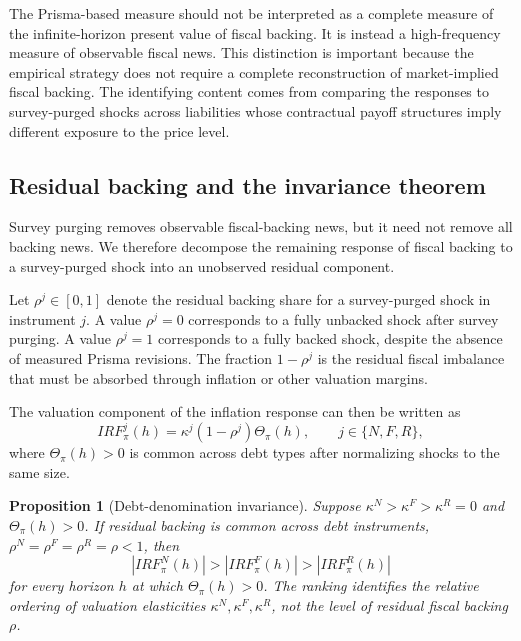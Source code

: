 \documentclass[12pt,a4paper]{article}
\newtheorem{proposition}{Proposition}
\begin{document}
The Prisma-based measure should not be interpreted as a complete measure of the infinite-horizon present value of fiscal backing. It is instead a high-frequency measure of observable fiscal news. This distinction is important because the empirical strategy does not require a complete reconstruction of market-implied fiscal backing. The identifying content comes from comparing the responses to survey-purged shocks across liabilities whose contractual payoff structures imply different exposure to the price level.

\subsection{Residual backing and the invariance theorem}

Survey purging removes observable fiscal-backing news, but it need not remove all backing news. We therefore decompose the remaining response of fiscal backing to a survey-purged shock into an unobserved residual component.

Let \(\rho^j\in[0,1]\) denote the residual backing share for a survey-purged shock in instrument \(j\). A value \(\rho^j=0\) corresponds to a fully unbacked shock after survey purging. A value \(\rho^j=1\) corresponds to a fully backed shock, despite the absence of measured Prisma revisions. The fraction \(1-\rho^j\) is the residual fiscal imbalance that must be absorbed through inflation or other valuation margins.

The valuation component of the inflation response can then be written as
\begin{equation}
IRF_{\pi}^{j}(h)
=
\kappa^j(1-\rho^j)\Theta_{\pi}(h),
\qquad
j\in\{N,F,R\},
\label{eq:irf_rho}
\end{equation}
where \(\Theta_{\pi}(h)>0\) is common across debt types after normalizing shocks to the same size.

\begin{proposition}[Debt-denomination invariance]
Suppose \(\kappa^N>\kappa^F>\kappa^R=0\) and \(\Theta_{\pi}(h)>0\). If residual backing is common across debt instruments, \(\rho^N=\rho^F=\rho^R=\rho<1\), then
\begin{equation}
|IRF_{\pi}^{N}(h)|>|IRF_{\pi}^{F}(h)|>|IRF_{\pi}^{R}(h)|
\end{equation}
for every horizon \(h\) at which \(\Theta_{\pi}(h)>0\). The ranking identifies the relative ordering of valuation elasticities \(\kappa^N,\kappa^F,\kappa^R\), not the level of residual fiscal backing \(\rho\).
\end{proposition}
\end{document}
